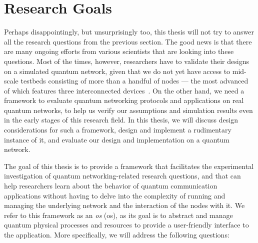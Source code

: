 \section{Research Goals}

Perhaps disappointingly, but unsurprisingly too, this thesis will not try to answer all the research
questions from the previous section. The good news is that there are many ongoing efforts from
various scientists that are looking into these questions. Most of the times, however, researchers
have to validate their designs on a simulated quantum network, given that we do not yet have access
to mid-scale testbeds consisting of more than a handful of nodes --- the most advanced of which
features three interconnected devices~\cite{pompili_2021_multinode}. On the other hand, we need a
framework to evaluate quantum networking protocols and applications on real quantum networks, to
help us verify our assumptions and simulation results even in the early stages of this research
field. In this thesis, we will discuss design considerations for such a framework, design and
implement a rudimentary instance of it, and evaluate our design and implementation on a quantum
network.

The goal of this thesis is to provide a framework that facilitates the experimental investigation of
quantum networking-related research questions, and that can help researchers learn about the
behavior of quantum communication applications without having to delve into the complexity of
running and managing the underlying network and the interaction of the nodes with it. We refer to
this framework as an \emph{\acrlong{os}} (\acrshort{os}), as its goal is to abstract and manage
quantum physical processes and resources to provide a user-friendly interface to the application.
More specifically, we will address the following questions:

